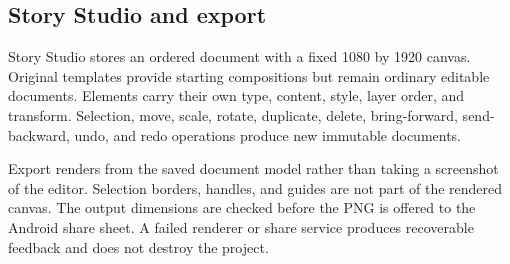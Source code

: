 
\subsection{Story Studio and export}
Story Studio stores an ordered document with a fixed 1080 by 1920 canvas. Original
templates provide starting compositions but remain ordinary editable documents.
Elements carry their own type, content, style, layer order, and transform.
Selection, move, scale, rotate, duplicate, delete, bring-forward, send-backward,
undo, and redo operations produce new immutable documents.

Export renders from the saved document model rather than taking a screenshot of
the editor. Selection borders, handles, and guides are not part of the rendered
canvas. The output dimensions are checked before the PNG is offered to the
Android share sheet. A failed renderer or share service produces recoverable
feedback and does not destroy the project.

